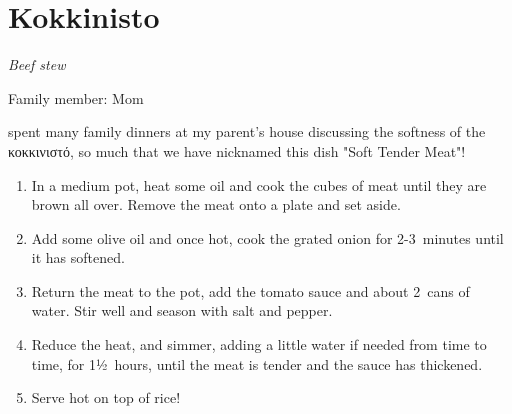 \chapter{Kokkinisto}
\label{ch:kokkinisto}


\textit{Beef stew}

Family member: Mom

 spent many family dinners at my parent's house discussing the softness of the \textgreek{κοκκινιστό}, so much that we have nicknamed this dish "Soft Tender Meat"!

\begin{enumerate}
    \item In a medium pot, heat some oil and cook the cubes of meat until they are brown all over. Remove the meat onto a plate and set aside.
    \item Add some olive oil and once hot, cook the grated onion for 2-3~minutes until it has softened.
    \item Return the meat to the pot, add the tomato sauce and about 2~cans of water. Stir well and season with salt and pepper.
    \item Reduce the heat, and simmer, adding a little water if needed from time to time, for 1½~hours, until the meat is tender and the sauce has thickened.
    \item Serve hot on top of rice!
\end{enumerate}

